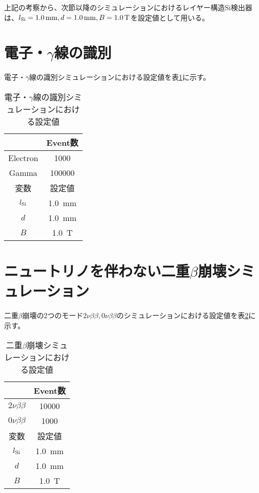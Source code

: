 \documentclass[a4paper,10pt]{jreport}
\begin{document}
上記の考察から、次節以降のシミュレーションにおけるレイヤー構造Si検出器は、$l_{\rm{Si}}=\SI{1.0}{mm}, d=\SI{1.0}{mm}, B=\SI{1.0}{T}$を設定値として用いる。



\section{電子・$\gamma$線の識別}

電子・$\gamma$線の識別シミュレーションにおける設定値を表\ref{Tab-ElectronGamma-Settei}に示す。



\begin{table}[H] 
	\center
	\caption{電子・$\gamma$線の識別シミュレーションにおける設定値} \label{Tab-ElectronGamma-Settei}
	\begin{tabular}{cc}
	\hline
	 & Event数 \\
	 \hline
	Electron & 1000 \\
	Gamma & 100000 \\
	\hline
	変数 & 設定値 \\
	\hline
	$l_{\rm{Si}}$ & \SI{1.0}{mm} \\
	$d$ & \SI{1.0}{mm} \\
	$B$ & \SI{1.0}{T} \\
	\hline
	\end{tabular}
\end{table}


\section{ニュートリノを伴わない二重$\beta$崩壊シミュレーション}

二重$\beta$崩壊の2つのモード$2\nu\beta\beta,0\nu\beta\beta$のシミュレーションにおける設定値を表\ref{Tab-DoubleBetaDecay-Settei}に示す。

\begin{table}[H] 
	\center
	\caption{二重$\beta$崩壊シミュレーションにおける設定値} \label{Tab-DoubleBetaDecay-Settei}
	\begin{tabular}{cc}
	\hline
	 & Event数 \\
	 \hline
	$2\nu\beta\beta$ & 10000 \\
	$0\nu\beta\beta$ & 1000 \\
	\hline
	変数 & 設定値 \\
	\hline
	$l_{\rm{Si}}$ & \SI{1.0}{mm} \\
	$d$ & \SI{1.0}{mm} \\
	$B$ & \SI{1.0}{T} \\
	\hline
	\end{tabular}
\end{table}
\end{document}
